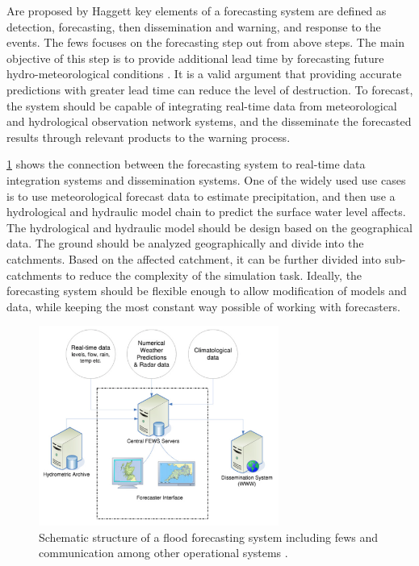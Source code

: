 Are proposed by Haggett \cite{Haggett1998AnWales} key elements of a forecasting system are defined as detection, forecasting, then dissemination and warning, and response to the events. The \acrshort{fews} focuses on the forecasting step out from above steps. The main objective of this step is to provide additional lead time by forecasting future hydro-meteorological conditions \cite{Werner2005FloodCatchments}. It is a valid argument that providing accurate predictions with greater lead time can reduce the level of destruction. To forecast, the system should be capable of integrating real-time data from meteorological and hydrological observation network systems, and the disseminate the forecasted results through relevant products to the warning process.

\cref{fi:fews_schematic} shows the connection between the forecasting system to real-time data integration systems and dissemination systems. One of the widely used use cases is to use meteorological forecast data to estimate precipitation, and then use a hydrological and hydraulic model chain to predict the surface water level affects. The hydrological and hydraulic model should be design based on the geographical data. The ground should be analyzed geographically and divide into the catchments. Based on the affected catchment, it can be further divided into sub-catchments to reduce the complexity of the simulation task. Ideally, the forecasting system should be flexible enough to allow modification of models and data, while keeping the most constant way possible of working with forecasters.

\begin{figure}[htp]
    \centering
    \includegraphics[width=0.7\textwidth]{lit/fews/Schematic-structure-of-a-fl-ood-forecasting-system-showing-the-position-of-Delft-FEWS_W640.png}
    \caption[Schematic structure of a flood forecasting system including \acrshort{fews} and communication among other operational systems]{Schematic structure of a flood forecasting system including \acrshort{fews} and communication among other operational systems \cite{Werner2013TheSystem}.}
    \label{fi:fews_schematic}
\end{figure}


